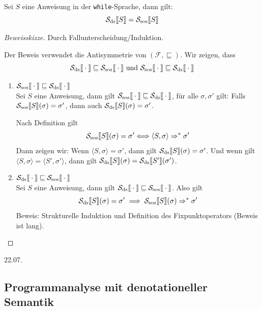 \begin{theorem}
    Sei $S$ eine Anweisung in der \texttt{while}-Sprache, dann gilt: \[
        \Sdssem{S} = \Ssossem{S}
    \]
\end{theorem}

\begin{proof}[Beweisskizze]
    Durch Fallunterscheidung/Induktion.

    Der Beweis verwendet die Antisymmetrie von $(\mathcal{F}, \sqsubseteq)$. Wir zeigen, dass \[
        \Sdssem{\cdot} \sqsubseteq \Ssossem{\cdot} \text{ und } \Ssossem{\cdot} \sqsubseteq \Sdssem{\cdot}
    \]

    \begin{enumerate}
        \item $\Ssossem{\cdot} \sqsubseteq \Sdssem{\cdot}$ \\
            Sei $S$ eine Anweisung, dann gilt $\Ssossem{\cdot} \sqsubseteq \Sdssem{\cdot}$, \dh{} für alle $\sigma, \sigma'$ gilt:
            Falls $\Ssossem{S}(\sigma) = \sigma'$, dann auch $\Sdssem{S}(\sigma) = \sigma'$.

            Nach Definition gilt \[
                \Ssossem{S}(\sigma) = \sigma' \Longleftrightarrow \langle S, \sigma \rangle \Rightarrow^* \sigma'
            \]
            Dann zeigen wir: Wenn $\langle S, \sigma \rangle = \sigma'$, dann gilt $\Sdssem{S}(\sigma)=\sigma'$.
            Und wenn gilt $\langle S, \sigma \rangle = \langle S', \sigma' \rangle$, dann gilt $\Sdssem{S}(\sigma) = \Sdssem{S'}(\sigma')$.

        \item $\Sdssem{\cdot} \sqsubseteq \Ssossem{\cdot}$ \\

            Sei $S$ eine Anweisung, dann gilt $\Sdssem{\cdot} \sqsubseteq \Ssossem{\cdot}$. Also gilt \[
                    \Sdssem{S}(\sigma) = \sigma' \implies \Ssossem{S}(\sigma) \Rightarrow^* \sigma'
            \]
            Beweis: Strukturelle Induktion und Definition des Fixpunktoperators (Beweis ist lang).
    \end{enumerate}
\end{proof}



\newpage
\hfill 22.07.

\subsection{Programmanalyse mit denotationeller Semantik}

